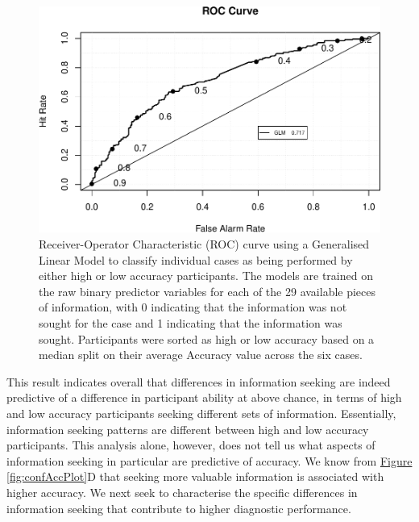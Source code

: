 \documentclass[a4paper, nobind]{templates/ociamthesis}
\begin{document}
\begin{figure}[H]

{\centering \includegraphics[width=1\linewidth]{_main_files/figure-latex/accuracyClassifier-1} 

}

\caption{Receiver-Operator Characteristic (ROC) curve using a Generalised Linear Model to classify individual cases as being performed by either high or low accuracy participants. The models are trained on the raw binary predictor variables for each of the 29 available pieces of information, with 0 indicating that the information was not sought for the case and 1 indicating that the information was sought. Participants were sorted as high or low accuracy based on a median split on their average Accuracy value across the six cases.}\label{fig:accuracyClassifier}
\end{figure}

This result indicates overall that differences in information seeking are indeed predictive of a difference in participant ability at above chance, in terms of high and low accuracy participants seeking different sets of information. Essentially, information seeking patterns are different between high and low accuracy participants. This analysis alone, however, does not tell us what aspects of information seeking in particular are predictive of accuracy. We know from \hyperref[fig:confAccPlot]{Figure \ref{fig:confAccPlot}}D that seeking more valuable information is associated with higher accuracy. We next seek to characterise the specific differences in information seeking that contribute to higher diagnostic performance.\\
\end{document}

